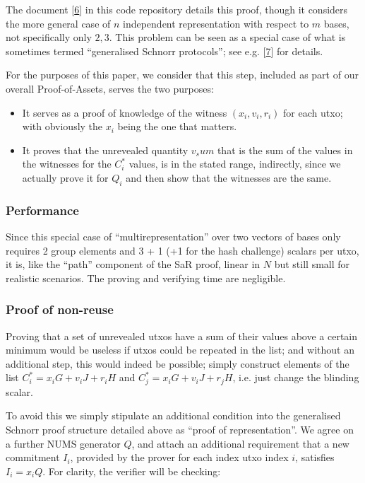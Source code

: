 \documentclass[10pt,a4paper]{article}
\begin{document}
The document {[}\protect\hyperlink{anchor-6}{6}{]} in this code repository details this proof, though it considers the more general case of $n$ independent representation with respect to $m$ bases, not specifically only $2, 3$. This problem can be seen as a special case of what is sometimes termed ``generalised Schnorr protocols''; see e.g. {[}\protect\hyperlink{anchor-7}{7}{]} for details.

For the purposes of this paper, we consider that this step, included as part of our overall Proof-of-Assets, serves the two purposes:

\begin{itemize}
\item It serves as a proof of knowledge of the witness $(x_i, v_i, r_i)$ for each utxo; with obviously the $x_i$ being the one that matters.
\item It proves that the unrevealed quantity $v_sum$ that is the sum of the values in the witnesses for the $C_i^*$ values, is in the stated range, indirectly, since we actually prove it for $Q_i$ and then show that the witnesses are the same.
\end{itemize}

\subsubsection{Performance}

Since this special case of ``multirepresentation'' over two vectors of bases only requires 2 group elements and 3 + 1 (+1 for the hash challenge) scalars per utxo, it is, like the ``path'' component of the SaR proof, linear in $N$ but still small for realistic scenarios. The proving and verifying time are negligible.

\subsubsection{Proof of non-reuse}

Proving that a set of unrevealed utxos have a sum of their values above a certain minimum would be useless if utxos could be repeated in the list; and without an additional step, this would indeed be possible; simply construct elements of the list $C_i^* = x_i G + v_i J + r_i H$ and $C_j^* = x_i G + v_i J + r_j H$, i.e. just change the blinding scalar.

\vspace{5 pt}

To avoid this we simply stipulate an additional condition into the generalised Schnorr proof structure detailed above as ``proof of representation''. We agree on a further NUMS generator $Q$, and attach an additional requirement that a new commitment $I_i$, provided by the prover for each index utxo index $i$, satisfies $I_i = x_i Q$. For clarity, the verifier will be checking:
\end{document}
